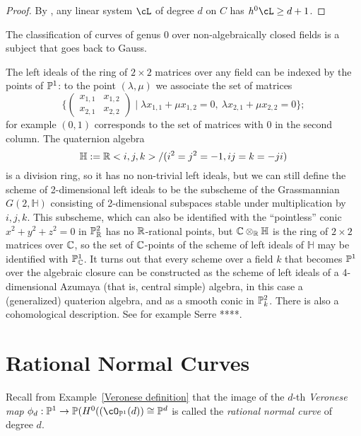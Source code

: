 \begin{proof}
 By \trr, any linear system $\cL$ of degree $d$ on $C$ has $h^0\cL \geq d+1$.
\end{proof}

The classification of curves of genus 0 over non-algebraically closed fields is a subject that goes back to Gauss.

\begin{fact}
The left ideals of the ring of $2\times 2$ matrices 
over any field can be indexed by the points of $\PP^1$: to the point $(\lambda, \mu)$ we associate the set of matrices 
$$\biggl\{
\begin{pmatrix}
 x_{1,1}&x_{1,2}\\
  x_{2,1}&x_{2,2}
\end{pmatrix} \mid \lambda  x_{1,1}+ \mu x_{1,2} = 0,\ \lambda  x_{2,1}+ \mu x_{2,2} = 0\biggr\};
$$
for example $(0,1)$ corresponds to the set of matrices with 0 in the second column.
\def\bH{{\mathbb H}}
The quaternion algebra 
$$
\bH := \RR<i,j,k>/(i^2 = j^2 = -1, ij=k = -ji)
$$
 is a division ring, so it has no non-trivial left ideals, but
we can still define the scheme of 2-dimensional left ideals to be the subscheme of the Grassmannian
$G(2,\bH)$ consisting of 2-dimensional subspaces stable under multiplication by $i,j,k$. This subscheme, which can also be identified with the ``pointless'' conic $x^2+y^2+z^2 = 0$ in $\PP^2_\RR$ has no
$\RR$-rational points, but $\CC\otimes_\RR \bH$ is the ring of $2\times 2$ matrices over $\CC$, so the set of $\CC$-points
of the scheme of left ideals of $\bH$ may be identified with $\PP^1_\CC$. It turns out that every scheme over a field $k$ that
becomes $\PP^1$ over the algebraic closure can be constructed as the scheme of left ideals of a 4-dimensional
Azumaya (that is, central simple) algebra, in this case a (generalized) quaterion algebra, and as a smooth conic in $\PP^2_k$. There is also a cohomological
description. See for example Serre ****.
\end{fact}


\section{Rational Normal Curves}
Recall from Example~\ref{Veronese definition} that the image of the $d$-th \emph{Veronese map}  $\phi_d: \PP^1 \to \PP(H^0((\cO_{\PP^1}(d)) \cong \PP^d$ is called the \emph{rational normal curve} of degree $d$. 

